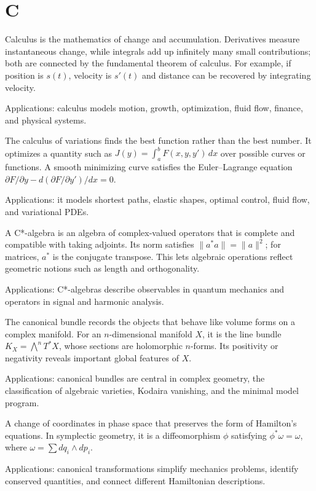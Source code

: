 \chapter*{C}
\label{chap:c}

Calculus is the mathematics of change and accumulation. Derivatives measure instantaneous change, while integrals add up infinitely many small contributions; both are connected by the fundamental theorem of calculus. For example, if position is $s(t)$, velocity is $s'(t)$ and distance can be recovered by integrating velocity. \par\noindent Applications: calculus models motion, growth, optimization, fluid flow, finance, and physical systems.

The calculus of variations finds the best function rather than the best number. It optimizes a quantity such as $J(y)=\int_a^bF(x,y,y')\,dx$ over possible curves or functions. A smooth minimizing curve satisfies the Euler--Lagrange equation $\partial F/\partial y-d(\partial F/\partial y')/dx=0$. \par\noindent Applications: it models shortest paths, elastic shapes, optimal control, fluid flow, and variational PDEs.

A C*-algebra is an algebra of complex-valued operators that is complete and compatible with taking adjoints. Its norm satisfies $\|a^*a\|=\|a\|^2$; for matrices, $a^*$ is the conjugate transpose. This lets algebraic operations reflect geometric notions such as length and orthogonality. \par\noindent Applications: C*-algebras describe observables in quantum mechanics and operators in signal and harmonic analysis.

The canonical bundle records the objects that behave like volume forms on a complex manifold. For an $n$-dimensional manifold $X$, it is the line bundle $K_X=\bigwedge^nT^*X$, whose sections are holomorphic $n$-forms. Its positivity or negativity reveals important global features of $X$. \par\noindent Applications: canonical bundles are central in complex geometry, the classification of algebraic varieties, Kodaira vanishing, and the minimal model program.

A change of coordinates in phase space that preserves the form of Hamilton's equations. In symplectic geometry, it is a diffeomorphism $\phi$ satisfying $\phi^*\omega=\omega$, where $\omega=\sum dq_i\wedge dp_i$. \par\noindent Applications: canonical transformations simplify mechanics problems, identify conserved quantities, and connect different Hamiltonian descriptions.

